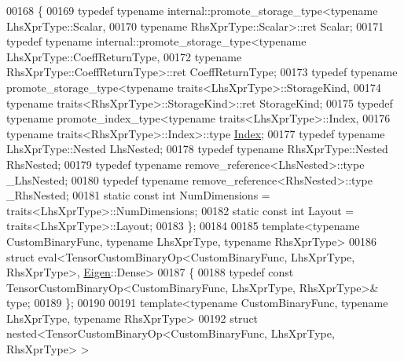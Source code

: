 \begin{DoxyCode}
00168 \{
00169   \textcolor{keyword}{typedef} \textcolor{keyword}{typename} internal::promote\_storage\_type<\textcolor{keyword}{typename} LhsXprType::Scalar,
00170                                                   \textcolor{keyword}{typename} RhsXprType::Scalar>::ret Scalar;
00171   \textcolor{keyword}{typedef} \textcolor{keyword}{typename} internal::promote\_storage\_type<\textcolor{keyword}{typename} LhsXprType::CoeffReturnType,
00172                                                   \textcolor{keyword}{typename} RhsXprType::CoeffReturnType>::ret 
      CoeffReturnType;
00173   \textcolor{keyword}{typedef} \textcolor{keyword}{typename} promote\_storage\_type<typename traits<LhsXprType>::StorageKind,
00174                                         \textcolor{keyword}{typename} traits<RhsXprType>::StorageKind>::ret StorageKind;
00175   \textcolor{keyword}{typedef} \textcolor{keyword}{typename} promote\_index\_type<typename traits<LhsXprType>::Index,
00176                                       \textcolor{keyword}{typename} traits<RhsXprType>::Index>::type 
      \hyperlink{namespace_eigen_a62e77e0933482dafde8fe197d9a2cfde}{Index};
00177   \textcolor{keyword}{typedef} \textcolor{keyword}{typename} LhsXprType::Nested LhsNested;
00178   \textcolor{keyword}{typedef} \textcolor{keyword}{typename} RhsXprType::Nested RhsNested;
00179   \textcolor{keyword}{typedef} \textcolor{keyword}{typename} remove\_reference<LhsNested>::type \_LhsNested;
00180   \textcolor{keyword}{typedef} \textcolor{keyword}{typename} remove\_reference<RhsNested>::type \_RhsNested;
00181   \textcolor{keyword}{static} \textcolor{keyword}{const} \textcolor{keywordtype}{int} NumDimensions = traits<LhsXprType>::NumDimensions;
00182   \textcolor{keyword}{static} \textcolor{keyword}{const} \textcolor{keywordtype}{int} Layout = traits<LhsXprType>::Layout;
00183 \};
00184 
00185 \textcolor{keyword}{template}<\textcolor{keyword}{typename} CustomBinaryFunc, \textcolor{keyword}{typename} LhsXprType, \textcolor{keyword}{typename} RhsXprType>
00186 \textcolor{keyword}{struct }eval<TensorCustomBinaryOp<CustomBinaryFunc, LhsXprType, RhsXprType>, 
      \hyperlink{namespace_eigen}{Eigen}::Dense>
00187 \{
00188   \textcolor{keyword}{typedef} \textcolor{keyword}{const} TensorCustomBinaryOp<CustomBinaryFunc, LhsXprType, RhsXprType>& type;
00189 \};
00190 
00191 \textcolor{keyword}{template}<\textcolor{keyword}{typename} CustomBinaryFunc, \textcolor{keyword}{typename} LhsXprType, \textcolor{keyword}{typename} RhsXprType>
00192 \textcolor{keyword}{struct }nested<TensorCustomBinaryOp<CustomBinaryFunc, LhsXprType, RhsXprType> >

\end{DoxyCode}
